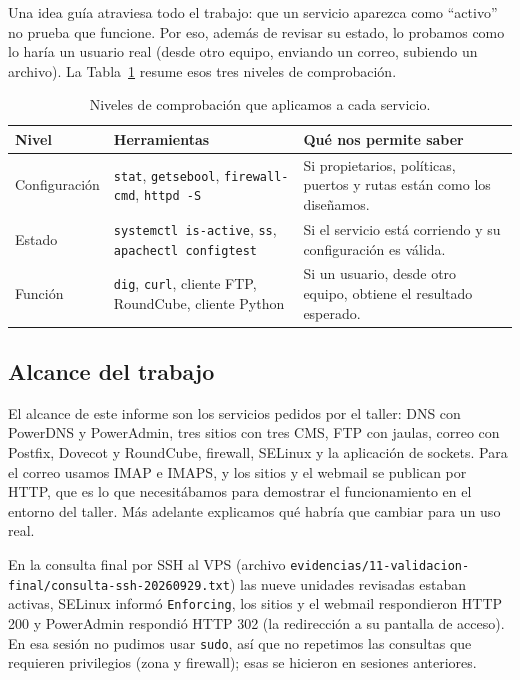 \documentclass[11pt,a4paper]{article}
\newcommand{\evid}[1]{\nolinkurl{evidencias/#1}}
\begin{document}
Una idea guía atraviesa todo el trabajo: que un servicio aparezca como ``activo'' no prueba que funcione. Por eso, además de revisar su estado, lo probamos como lo haría un usuario real (desde otro equipo, enviando un correo, subiendo un archivo). La Tabla~\ref{tab:niveles} resume esos tres niveles de comprobación.

\begin{table}[htbp]\centering\small
\caption{Niveles de comprobación que aplicamos a cada servicio.}\label{tab:niveles}
\begin{tabular}{@{}p{2.4cm}p{4.6cm}p{5.8cm}@{}}\toprule
Nivel & Herramientas & Qué nos permite saber \\\midrule
Configuración & \texttt{stat}, \texttt{getsebool}, \texttt{firewall-cmd}, \texttt{httpd -S} & Si propietarios, políticas, puertos y rutas están como los diseñamos. \\
Estado & \texttt{systemctl is-active}, \texttt{ss}, \texttt{apachectl configtest} & Si el servicio está corriendo y su configuración es válida. \\
Función & \texttt{dig}, \texttt{curl}, cliente FTP, RoundCube, cliente Python & Si un usuario, desde otro equipo, obtiene el resultado esperado. \\
\bottomrule\end{tabular}
\end{table}

\subsection{Alcance del trabajo}
El alcance de este informe son los servicios pedidos por el taller: DNS con PowerDNS y PowerAdmin, tres sitios con tres CMS, FTP con jaulas, correo con Postfix, Dovecot y RoundCube, firewall, SELinux y la aplicación de sockets. Para el correo usamos IMAP e IMAPS, y los sitios y el webmail se publican por HTTP, que es lo que necesitábamos para demostrar el funcionamiento en el entorno del taller. Más adelante explicamos qué habría que cambiar para un uso real.

En la consulta final por SSH al VPS (archivo \evid{11-validacion-final/consulta-ssh-20260929.txt}) las nueve unidades revisadas estaban activas, SELinux informó \texttt{Enforcing}, los sitios y el webmail respondieron HTTP 200 y PowerAdmin respondió HTTP 302 (la redirección a su pantalla de acceso). En esa sesión no pudimos usar \texttt{sudo}, así que no repetimos las consultas que requieren privilegios (zona y firewall); esas se hicieron en sesiones anteriores.
\end{document}
